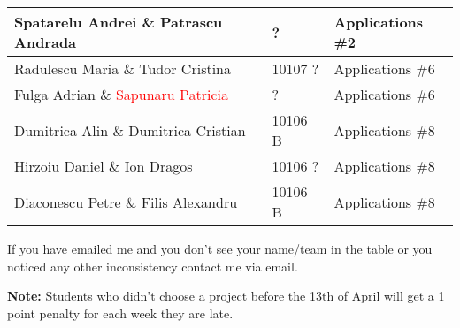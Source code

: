 \documentclass{article}
\begin{document}
\begin{center}
\begin{tabular}{ | l | l | l | }
    Spatarelu Andrei \& Patrascu Andrada & ? & Applications \#2 \\ \hline
    Radulescu Maria \& Tudor Cristina & 10107 ? & Applications \#6 \\ \hline
    Fulga Adrian \& \textcolor{red}{Sapunaru Patricia} & ? & Applications \#6 \\ \hline
    Dumitrica Alin \& Dumitrica Cristian & 10106 B & Applications \#8 \\ \hline
    Hirzoiu Daniel \& Ion Dragos & 10106 ? & Applications \#8 \\ \hline
    Diaconescu Petre \& Filis Alexandru & 10106 B & Applications \#8 \\
    \hline
  \end{tabular}
\end{center}

If you have emailed me and you don't see your name/team in the table or you noticed any other inconsistency contact me via email.

\textbf{Note:} Students who didn't choose a project before the 13th of April will get a 1 point penalty for each week they are late.
\end{document}

